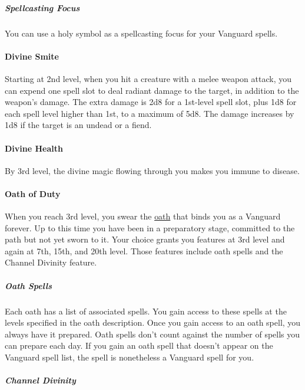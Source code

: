 \subparagraph{Spellcasting Focus}\label{_spellcasting_focus_2}

You can use a holy symbol as a spellcasting focus for your Vanguard
spells.

\paragraph{Divine Smite}\label{vanguard-feature-divine-smite}

Starting at 2nd level, when you hit a creature with a melee weapon
attack, you can expend one spell slot to deal radiant damage to the
target, in addition to the weapon's damage. The extra damage is 2d8 for
a 1st-level spell slot, plus 1d8 for each spell level higher than 1st,
to a maximum of 5d8. The damage increases by 1d8 if the target is an
undead or a fiend.

\paragraph{Divine Health}\label{vanguard-feature-divine-health}

By 3rd level, the divine magic flowing through you makes you immune to
disease.

\paragraph{Oath of Duty}\label{vanguard-feature-oath-of-duty}

When you reach 3rd level, you swear the
\hyperref[vanguard-subclasses]{oath} that binds you as a Vanguard
forever. Up to this time you have been in a preparatory stage, committed
to the path but not yet sworn to it. Your choice grants you features at
3rd level and again at 7th, 15th, and 20th level. Those features include
oath spells and the Channel Divinity feature.

\subparagraph{Oath
Spells}\label{vanguard-feature-oath-of-duty-oath-spells}

Each oath has a list of associated spells. You gain access to these
spells at the levels specified in the oath description. Once you gain
access to an oath spell, you always have it prepared. Oath spells don't
count against the number of spells you can prepare each day. If you gain
an oath spell that doesn't appear on the Vanguard spell list, the spell
is nonetheless a Vanguard spell for you.

\subparagraph{Channel
Divinity}\label{vanguard-feature-oath-of-duty-channel-divinity}


